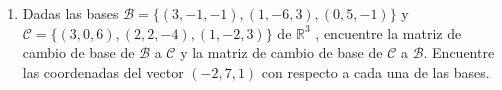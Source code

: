 \documentclass[11pt,letterpaper]{article}
\newcommand{\mR}{\mathbb{R}}
\newcommand{\mcC}{\mathcal{C}}
\newcommand{\mcR}{\mathcal{R}}
\newcommand{\mcN}{\mathcal{N}}
\newcommand{\fin}{$\blacksquare.$}
\begin{document}
\begin{enumerate}
\begin{align*}
\begin{pmatrix}1\\6\\2\\0\\2\end{pmatrix}\right\}.
\end{align*}
Entonces como los vectores $\left\{\begin{pmatrix}2\\9\\4\\-3\\10\end{pmatrix}, 
\begin{pmatrix}1\\7\\2\\3\\-4\end{pmatrix},
\begin{pmatrix}1\\6\\2\\0\\2\end{pmatrix}\right\}$ son linealmente independiente y generan a $\mcR(A)$ podemos decir que \textbf{son una base para} $\mcR(A)$ (por la definición de base \ref{base}). Y entonces, la \textbf{dimensión del espacio renglon de $A$ es} 3.\ \ \ \fin

Nota: Se muestra que $\mcC(A)=\mcR(A)$ y que $\mcC(A)+\mcN(A)=n.$
\item Dadas las bases $\mathcal{B}= \{(3, -1, -1), (1, -6, 3), (0, 5, -1)\}$ y $\mcC = \{(3, 0, 6), (2, 2, -4), (1, -2, 3)\}$ de $\mR^3$ , encuentre la matriz de cambio de base
de $\mathcal{B}$ a $\mcC$ y la matriz de cambio de base de $\mcC$ a $\mathcal{B}$. Encuentre las coordenadas del vector $(-2, 7, 1)$ con respecto a cada una de las bases.


\end{enumerate}
\end{document}
